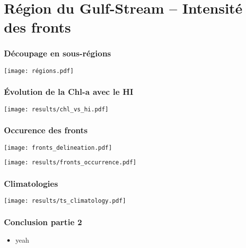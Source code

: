 \documentclass[11pt, french, aspectratio=32]{beamer}
\begin{document}

\section{Région du Gulf-Stream -- Intensité des fronts}


\begin{frame}
  \frametitle{Découpage en sous-régions}
  \texttt{[image: régions.pdf]}
\end{frame}


\begin{frame}
  \frametitle{Évolution de la Chl-a avec le HI}
  \texttt{[image: results/chl\_vs\_hi.pdf]}
\end{frame}


\begin{frame}
  \frametitle{Occurence des fronts}
  \texttt{[image: fronts\_delineation.pdf]}
  \\
  \vfill

  \texttt{[image: results/fronts\_occurrence.pdf]}

\end{frame}


\begin{frame}
  \frametitle{Climatologies}
  \texttt{[image: results/ts\_climatology.pdf]}
\end{frame}


\begin{frame}
  \frametitle{Conclusion partie 2}

  \vfill
  \begin{itemize}
    \item yeah
  \end{itemize}
  \vfill

\end{frame}
\end{document}
